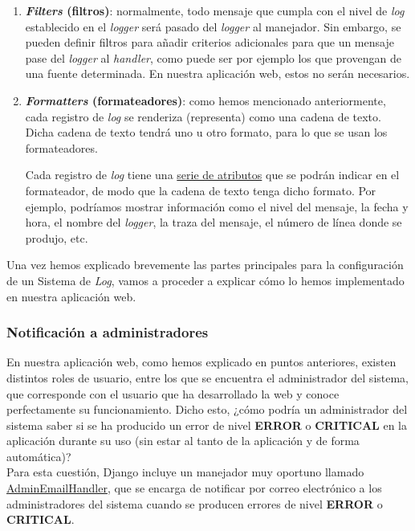 \begin{enumerate}
        \item \textbf{\textit{Filters} (filtros)}: normalmente, todo mensaje que cumpla con
        el nivel de \textit{log} establecido en el \textit{logger} será pasado del
        \textit{logger} al manejador. Sin embargo, se pueden definir filtros para añadir
        criterios adicionales para que un mensaje pase del \textit{logger} al
        \textit{handler}, como puede ser por ejemplo los que provengan de una fuente
        determinada. En nuestra aplicación web, estos no serán necesarios.

        \item \textbf{\textit{Formatters} (formateadores)}: como hemos mencionado
        anteriormente, cada registro de \textit{log} se renderiza (representa) como una
        cadena de texto. Dicha cadena de texto tendrá uno u otro formato, para lo que se
        usan los formateadores.
        
        Cada registro de \textit{log} tiene una 
        \href{https://docs.python.org/3/library/logging.html#logrecord-attributes}{serie
        de atributos}  que se podrán indicar en el formateador, de modo que la cadena de
        texto tenga dicho formato. Por ejemplo, podríamos mostrar información como el
        nivel del mensaje, la fecha y hora, el nombre del \textit{logger}, la traza del
        mensaje, el número de línea donde se produjo, etc.
    \end{enumerate}

Una vez hemos explicado brevemente las partes principales para la configuración de un
Sistema de \textit{Log}, vamos a proceder a explicar cómo lo hemos implementado en nuestra
aplicación web.

\subsubsection{Notificación a administradores}
En nuestra aplicación web, como hemos explicado en puntos anteriores, existen distintos
roles de usuario, entre los que se encuentra el administrador del sistema, que corresponde
con el usuario que ha desarrollado la web y conoce perfectamente su funcionamiento. Dicho
esto, ¿cómo podría un administrador del sistema saber si se ha producido un error de
nivel \textbf{ERROR} o \textbf{CRITICAL} en la aplicación durante su uso (sin estar al
tanto de la aplicación y de forma automática)? \\

Para esta cuestión, Django incluye un manejador muy oportuno llamado
\href{https://docs.djangoproject.com/en/4.0/ref/logging/#django.utils.log.AdminEmailHandler}
{AdminEmailHandler}, que se encarga de notificar por correo electrónico a los
administradores del sistema cuando se producen errores de nivel \textbf{ERROR} o
\textbf{CRITICAL}. \\

